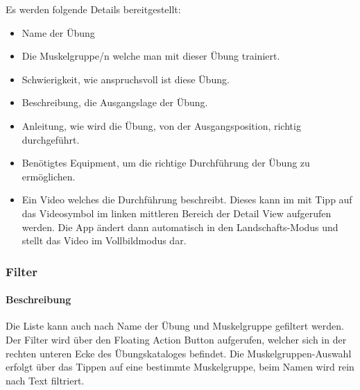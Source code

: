 \documentclass[FIPLY_base.tex]{subfiles}
\begin{document}
Es werden folgende Details bereitgestellt:

\begin{itemize}
\item Name der Übung
\item Die Muskelgruppe/n welche man mit dieser Übung trainiert.
\item Schwierigkeit, wie anspruchsvoll ist diese Übung.
\item Beschreibung, die Ausgangslage der Übung.
\item Anleitung, wie wird die Übung, von der Ausgangsposition, richtig durchgeführt.
\item Benötigtes Equipment, um die richtige Durchführung der Übung zu ermöglichen.
\item Ein Video welches die Durchführung beschreibt. Dieses kann im mit Tipp auf das Videosymbol im linken mittleren Bereich der Detail View aufgerufen werden.
Die App ändert dann automatisch in den Landschafts-Modus und stellt das Video im Vollbildmodus dar.

\end{itemize}



\subsubsection{Filter}
\paragraph{Beschreibung}
Die Liste kann auch nach Name der Übung und Muskelgruppe gefiltert werden. 
Der Filter wird über den Floating Action Button aufgerufen, welcher sich in der rechten unteren Ecke des Übungskataloges befindet.
Die Muskelgruppen-Auswahl erfolgt über das Tippen auf eine bestimmte Muskelgruppe, beim Namen wird rein nach Text filtriert.
\end{document}
